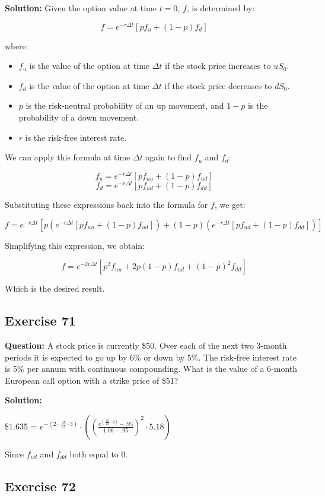 \documentclass{article}
\begin{document}
\textbf{Solution:}
Given the option value at time $t = 0$, $f$, is determined by:

\[ f = e^{-r \Delta t} [pf_u + (1 - p)f_d] \]

where:
\begin{itemize}
  \item $f_u$ is the value of the option at time $\Delta t$ if the stock price increases to $uS_0$.
  \item $f_d$ is the value of the option at time $\Delta t$ if the stock price decreases to $dS_0$.
  \item $p$ is the risk-neutral probability of an up movement, and $1 - p$ is the probability of a down movement.
  \item $r$ is the risk-free interest rate.
\end{itemize}

We can apply this formula at time $\Delta t$ again to find $f_u$ and $f_d$:

\[ f_u = e^{-r \Delta t} [pf_{uu} + (1 - p)f_{ud}] \]
\[ f_d = e^{-r \Delta t} [pf_{ud} + (1 - p)f_{dd}] \]

Substituting these expressions back into the formula for $f$, we get:

\[ f = e^{-r \Delta t} [p(e^{-r \Delta t} [pf_{uu} + (1 - p)f_{ud}]) + (1 - p)(e^{-r \Delta t} [pf_{ud} + (1 - p)f_{dd}])] \]

Simplifying this expression, we obtain:

\[ f = e^{-2r \Delta t} [p^{2}f_{uu} + 2p(1 - p)f_{ud} + (1 - p)^{2}f_{dd}] \]

Which is the desired result.

\subsection*{Exercise 71}
\textbf{Question:} A stock price is currently \$50. Over each of the next two 3-month periods it is expected to go up by 6\% or down by 5\%. The risk-free interest rate is 5\% per annum with continuous compounding. What is the value of a 6-month European call option with a strike price of \$51?

\textbf{Solution:}

\$1.635 = $e^{-\left(2\cdot\frac{.05}{12}\cdot3\right)}\cdot\left(\left(\frac{e^{\left(\frac{.05}{12}\cdot3\right)}-.95}{1.06-.95}\right)^{2}\cdot5.18\right)$

Since $f_{ud}$ and $f_{dd}$ both equal to 0.

\subsection*{Exercise 72}
\end{document}
